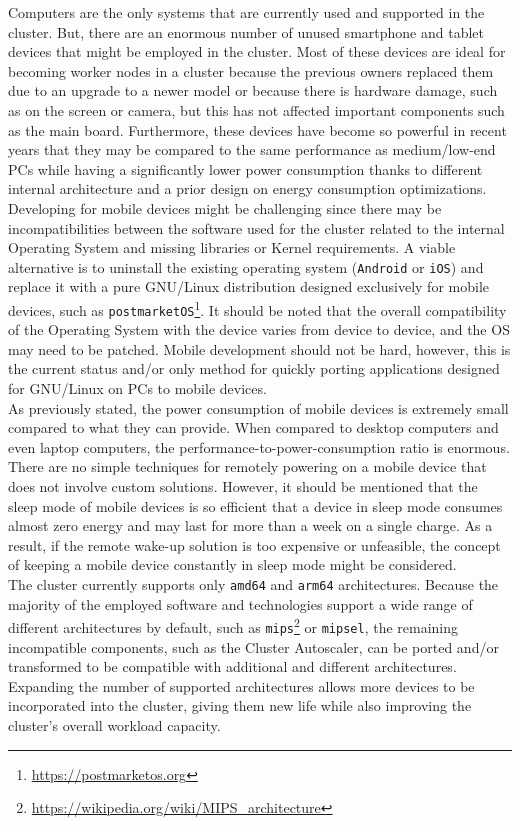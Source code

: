 Computers are the only systems that are currently used and supported in the
cluster. But, there are an enormous number of unused smartphone and tablet
devices that might be employed in the cluster. Most of these devices are ideal for
becoming worker nodes in a cluster because the previous owners replaced them due
to an upgrade to a newer model or because there is hardware damage, such as on
the screen or camera, but this has not affected important components such as the
main board. Furthermore, these devices have become so powerful in recent years that
they may be compared to the same performance as medium/low-end PCs while having a
significantly lower power consumption thanks to different internal architecture and
a prior design on energy consumption optimizations. \\ %
Developing for mobile devices might be challenging since there may be incompatibilities
between the software used for the cluster related to the internal Operating System
and missing libraries or Kernel requirements. A viable alternative is to
uninstall the existing operating system (\texttt{Android} or \texttt{iOS}) and
replace it with a pure GNU/Linux distribution designed exclusively for mobile
devices, such as \texttt{postmarketOS}\footnote{\url{https://postmarketos.org}}.
It should be noted that the overall compatibility of the Operating System with the
device varies from device to device, and the OS may need to be patched. Mobile development
should not be hard, however, this is the current status and/or only method for quickly
porting applications designed for GNU/Linux on PCs to mobile devices. \\ %
As previously stated, the power consumption of mobile devices is extremely small
compared to what they can provide. When compared to desktop computers and even laptop
computers, the performance-to-power-consumption ratio is enormous. There are no simple
techniques for remotely powering on a mobile device that does not involve custom
solutions. However, it should be mentioned that the sleep mode of mobile devices
is so efficient that a device in sleep mode consumes almost zero energy and may last
for more than a week on a single charge. As a result, if the remote wake-up solution
is too expensive or unfeasible, the concept of keeping a mobile device
constantly in sleep mode might be considered. \\ %

The cluster currently supports only \texttt{amd64} and \texttt{arm64} architectures.
Because the majority of the employed software and technologies support a wide
range of different architectures by default, such as \texttt{mips}\footnote{\url{https://wikipedia.org/wiki/MIPS_architecture}}
or \texttt{mipsel}, the remaining incompatible components, such as the Cluster Autoscaler,
can be ported and/or transformed to be compatible with additional and different
architectures. \\ %
Expanding the number of supported architectures allows more devices to be
incorporated into the cluster, giving them new life while also improving the cluster's
overall workload capacity. \\ %

